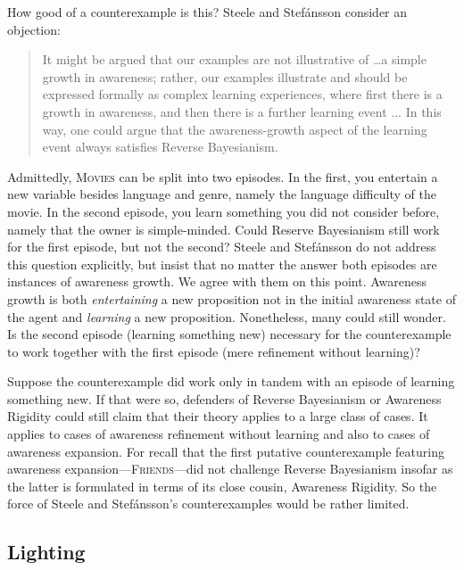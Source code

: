 \documentclass[
  11pt,
  dvipsnames,enabledeprecatedfontcommands]{scrartcl}
\begin{document}
How good of a counterexample is this? Steele and Stefánsson consider an
objection:

\begin{quote}It might be argued that our examples are not illustrative of \dots a simple growth in awareness; rather, our examples illustrate and should be expressed 
  formally as complex learning experiences, where first there is a growth in awareness, and then 
  there is a further learning event ... In this way, one could argue that the awareness-growth 
  aspect of the learning event always satisfies Reverse Bayesianism.
\end{quote}

\doublespace

\noindent  Admittedly, \textsc{Movies} can be split into two episodes.
In the first, you entertain a new variable besides language and genre,
namely the language difficulty of the movie. In the second episode, you
learn something you did not consider before, namely that the owner is
simple-minded. Could Reserve Bayesianism still work for the first
episode, but not the second? Steele and Stefánsson do not address this
question explicitly, but insist that no matter the answer both episodes
are instances of awareness growth. We agree with them on this point.
Awareness growth is both \textit{entertaining} a new proposition not in
the initial awareness state of the agent and \textit{learning} a new
proposition. Nonetheless, many could still wonder. Is the second episode
(learning something new) necessary for the counterexample to work
together with the first episode (mere refinement without learning)?

Suppose the counterexample did work only in tandem with an episode of
learning something new. If that were so, defenders of Reverse
Bayesianism or Awareness Rigidity could still claim that their theory
applies to a large class of cases. It applies to cases of awareness
refinement without learning and also to cases of awareness expansion.
For recall that the first putative counterexample featuring awareness
expansion---\textsc{Friends}---did not challenge Reverse Bayesianism
insofar as the latter is formulated in terms of its close cousin,
Awareness Rigidity. So the force of Steele and Stefánsson's
counterexamples would be rather limited.

\hypertarget{lighting}{%
\subsection{Lighting}\label{lighting}}
\end{document}
